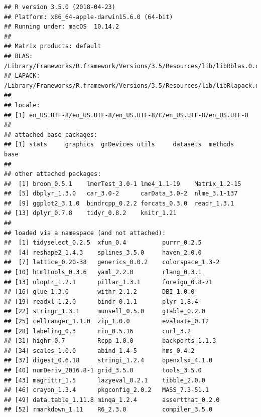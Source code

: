 \documentclass[]{article}
\begin{document}
\begin{verbatim}
## R version 3.5.0 (2018-04-23)
## Platform: x86_64-apple-darwin15.6.0 (64-bit)
## Running under: macOS  10.14.2
## 
## Matrix products: default
## BLAS: /Library/Frameworks/R.framework/Versions/3.5/Resources/lib/libRblas.0.dylib
## LAPACK: /Library/Frameworks/R.framework/Versions/3.5/Resources/lib/libRlapack.dylib
## 
## locale:
## [1] en_US.UTF-8/en_US.UTF-8/en_US.UTF-8/C/en_US.UTF-8/en_US.UTF-8
## 
## attached base packages:
## [1] stats     graphics  grDevices utils     datasets  methods   base     
## 
## other attached packages:
##  [1] broom_0.5.1    lmerTest_3.0-1 lme4_1.1-19    Matrix_1.2-15 
##  [5] dbplyr_1.3.0   car_3.0-2      carData_3.0-2  nlme_3.1-137  
##  [9] ggplot2_3.1.0  bindrcpp_0.2.2 forcats_0.3.0  readr_1.3.1   
## [13] dplyr_0.7.8    tidyr_0.8.2    knitr_1.21    
## 
## loaded via a namespace (and not attached):
##  [1] tidyselect_0.2.5  xfun_0.4          purrr_0.2.5      
##  [4] reshape2_1.4.3    splines_3.5.0     haven_2.0.0      
##  [7] lattice_0.20-38   generics_0.0.2    colorspace_1.3-2 
## [10] htmltools_0.3.6   yaml_2.2.0        rlang_0.3.1      
## [13] nloptr_1.2.1      pillar_1.3.1      foreign_0.8-71   
## [16] glue_1.3.0        withr_2.1.2       DBI_1.0.0        
## [19] readxl_1.2.0      bindr_0.1.1       plyr_1.8.4       
## [22] stringr_1.3.1     munsell_0.5.0     gtable_0.2.0     
## [25] cellranger_1.1.0  zip_1.0.0         evaluate_0.12    
## [28] labeling_0.3      rio_0.5.16        curl_3.2         
## [31] highr_0.7         Rcpp_1.0.0        backports_1.1.3  
## [34] scales_1.0.0      abind_1.4-5       hms_0.4.2        
## [37] digest_0.6.18     stringi_1.2.4     openxlsx_4.1.0   
## [40] numDeriv_2016.8-1 grid_3.5.0        tools_3.5.0      
## [43] magrittr_1.5      lazyeval_0.2.1    tibble_2.0.0     
## [46] crayon_1.3.4      pkgconfig_2.0.2   MASS_7.3-51.1    
## [49] data.table_1.11.8 minqa_1.2.4       assertthat_0.2.0 
## [52] rmarkdown_1.11    R6_2.3.0          compiler_3.5.0
\end{verbatim}
\end{document}
